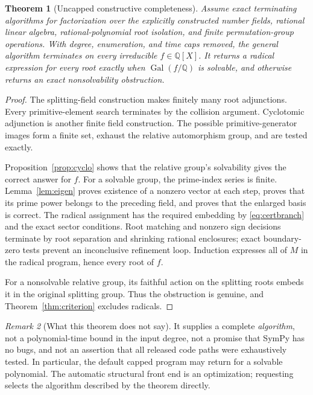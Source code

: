 \documentclass[11pt,letterpaper]{article}
\newtheorem{theorem}{Theorem}[section]
\theoremstyle{definition}\newtheorem{definition}[theorem]{Definition}
\theoremstyle{remark}\newtheorem{remark}[theorem]{Remark}
\newcommand{\Q}{\mathbb Q}\newcommand{\C}{\mathbb C}\newcommand{\Z}{\mathbb Z}
\newcommand{\Gal}{\operatorname{Gal}}\newcommand{\Aut}{\operatorname{Aut}}
\newcommand{\code}[1]{\texttt{\detokenize{#1}}}
\begin{document}
\begin{theorem}[Uncapped constructive completeness]\label{thm:complete}
Assume exact terminating algorithms for factorization over the explicitly constructed number fields, rational linear algebra, rational-polynomial root isolation, and finite permutation-group operations. With degree, enumeration, and time caps removed, the general algorithm terminates on every irreducible $f\in\Q[X]$. It returns a radical expression for every root exactly when $\Gal(f/\Q)$ is solvable, and otherwise returns an exact nonsolvability obstruction.
\end{theorem}
\begin{proof}
The splitting-field construction makes finitely many root adjunctions. Every primitive-element search terminates by the collision argument. Cyclotomic adjunction is another finite field construction. The possible primitive-generator images form a finite set, exhaust the relative automorphism group, and are tested exactly.

Proposition~\ref{prop:cyclo} shows that the relative group's solvability gives the correct answer for $f$. For a solvable group, the prime-index series is finite. Lemma~\ref{lem:eigen} proves existence of a nonzero vector at each step, proves that its prime power belongs to the preceding field, and proves that the enlarged basis is correct. The radical assignment has the required embedding by \eqref{eq:certbranch} and the exact sector conditions. Root matching and nonzero sign decisions terminate by root separation and shrinking rational enclosures; exact boundary-zero tests prevent an inconclusive refinement loop. Induction expresses all of $M$ in the radical program, hence every root of $f$.

For a nonsolvable relative group, its faithful action on the splitting roots embeds it in the original splitting group. Thus the obstruction is genuine, and Theorem~\ref{thm:criterion} excludes radicals.
\end{proof}

\begin{remark}[What this theorem does not say]
It supplies a complete \emph{algorithm}, not a polynomial-time bound in the input degree, not a promise that SymPy has no bugs, and not an assertion that all released code paths were exhaustively tested. In particular, the default capped program may return \code{Unknown} for a solvable polynomial. The automatic structural front end is an optimization; requesting \code{method='general'} selects the algorithm described by the theorem directly.
\end{remark}
\end{document}
